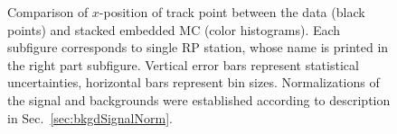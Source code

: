 \begin{figure}[h]
{\begin{subfigure}[b]{\linewidth}
  \end{subfigure}
    \begin{minipage}[t][1.042\linewidth][t]{\linewidth}\end{minipage}
}
\caption[Comparison of $x$-position of track point between the data and stacked embedded MC.]{Comparison of $x$-position of track point between the data (black points) and stacked embedded MC (color histograms). Each subfigure corresponds to single RP station, whose name is printed in the right part subfigure. Vertical error bars represent statistical uncertainties, horizontal bars represent bin sizes. Normalizations of the signal and backgrounds were established according to description in Sec.~\ref{sec:bkgdSignalNorm}.}\label{fig:xRp}%
\end{figure}




